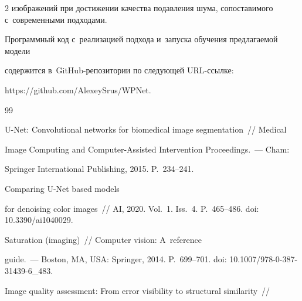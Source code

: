 \begin{multicols}{2}
изображений при достижении качества подавления шума, сопоставимого с~современными подходами.





Программный код с~реализацией подхода и~запуска обучения предлагаемой модели 


содержится в~GitHub-ре\-по\-зи\-то\-рии по следующей URL-ссыл\-ке: 


{\sf https://github.com/AlexeySrus/WPNet}.





{\small\frenchspacing


 { %




 \begin{thebibliography}{99}






    U-Net: Convolutional networks for biomedical image segmentation~// Medical 


Image     Computing and Computer-Assisted Intervention Proceedings.~--- Cham: 


Springer International Publishing, 2015. P.~234--241.







     Comparing U-Net based  models


    for denoising color images~// AI, 2020. Vol.~1. Iss.~4. P.~465--486. doi:  10.3390/ai1040029.







     Saturation (imaging)~// Computer vision: A~reference


guide.~--- Boston, MA, USA: Springer, 2014. P.~699--701. doi: 10.1007/978-0-387-31439-6\_483.


    






    Image quality assessment: From error visibility to structural similarity~//



\end{thebibliography}}}
\end{multicols}
